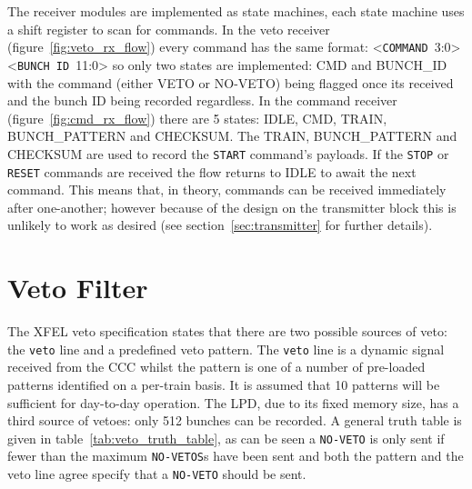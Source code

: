 \documentclass[]{report}
\begin{document}
    The receiver modules are implemented as state machines, each state machine uses a shift register to scan for commands. In the veto receiver (figure~\ref{fig:veto_rx_flow}) every command has the same format: <\texttt{COMMAND}~3:0><\texttt{BUNCH~ID}~11:0> so only two states are implemented: CMD and BUNCH\_ID with the command (either VETO or NO-VETO) being flagged once its received and the bunch ID being recorded regardless. In the command receiver (figure~\ref{fig:cmd_rx_flow}) there are 5 states: IDLE, CMD, TRAIN, BUNCH\_PATTERN and CHECKSUM. The TRAIN, BUNCH\_PATTERN and CHECKSUM are used to record the \texttt{START} command's payloads. If the \texttt{STOP} or \texttt{RESET} commands are received the flow returns to IDLE to await the next command. This means that, in theory, commands can be received immediately after one-another; however because of the design on the transmitter block this is unlikely to work as desired (see section~\ref{sec:transmitter} for further details).
    \chapter{Veto Filter} %
    \label{sec:veto_filter}
    The XFEL veto specification states that there are two possible sources of veto: the \texttt{veto} line and a predefined veto pattern. The \texttt{veto} line is a dynamic signal received from the CCC whilst the pattern is one of a number of pre-loaded patterns identified on a per-train basis. It is assumed that 10 patterns will be sufficient for day-to-day operation. The LPD, due to its fixed memory size, has a third source of vetoes: only 512 bunches can be recorded. A general truth table is given in table~\ref{tab:veto_truth_table}, as can be seen a \texttt{NO-VETO} is only sent if fewer than the maximum \texttt{NO-VETOS}s have been sent and both the pattern and the veto line agree specify that a \texttt{NO-VETO} should be sent.
    
\end{document}
